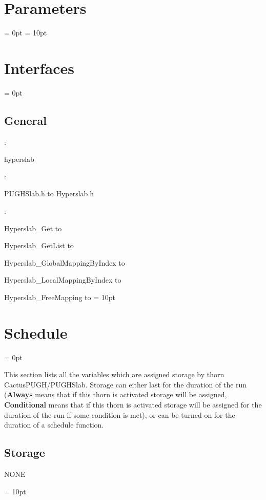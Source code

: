 \documentclass{article}
\begin{document}



\section{Parameters} 


\parskip = 0pt
\parskip = 10pt 

\section{Interfaces} 


\parskip = 0pt

\vspace{3mm} \subsection*{General}

: 

hyperslab
\vspace{2mm}

\vspace{5mm}

: 



PUGHSlab.h to Hyperslab.h
\vspace{2mm}

: 



Hyperslab\_Get to 

Hyperslab\_GetList to 

Hyperslab\_GlobalMappingByIndex to 

Hyperslab\_LocalMappingByIndex to 

Hyperslab\_FreeMapping to 
\vspace{2mm}\parskip = 10pt 

\section{Schedule} 


\parskip = 0pt


\noindent This section lists all the variables which are assigned storage by thorn CactusPUGH/PUGHSlab.  Storage can either last for the duration of the run ({\bf Always} means that if this thorn is activated storage will be assigned, {\bf Conditional} means that if this thorn is activated storage will be assigned for the duration of the run if some condition is met), or can be turned on for the duration of a schedule function.


\subsection*{Storage}NONE

\vspace{5mm}\parskip = 10pt 
\end{document}

